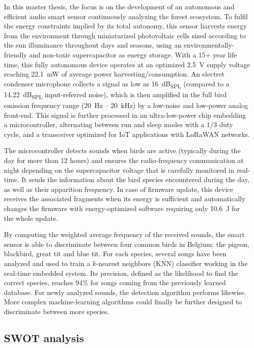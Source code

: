 \documentclass{EPL-master-thesis-covers-EN}
\begin{document}
In this master thesis, the focus is on the development of an autonomous and efficient audio smart sensor continuously analyzing the forest ecosystem. To fulfil the energy constraints implied by its total autonomy, this sensor harvests energy from the environment through miniaturized photovoltaic cells sized according to the sun illuminance throughout days and seasons, using an environmentally-friendly and non-toxic supercapacitor as energy storage.
With a 15+ year life time, this fully autonomous device operates at an optimized \SI{2.5}{V} supply voltage reaching \SI{22.1}{mW} of average power harvesting/consumption. An electret condenser microphone collects a signal as low as \SI{16}{dB_{SPL}} (compared to a \SI{14.22}{dB_{SPL}} input-referred noise), which is then amplified in the full bird emission frequency range (\SI{20}{Hz} -- \SI{20}{kHz}) by a low-noise and low-power analog front-end. This signal is further processed in an ultra-low-power chip embedding a microcontroller, alternating between run and sleep modes with a $1/3$ duty cycle, and a transceiver optimized for IoT applications with LoRaWAN networks. 

The microcontroller detects sounds when birds are active (typically during the day for more than 12 hours) and ensures the radio-frequency communication at night depending on the supercapacitor voltage that is carefully monitored in real-time. It sends the information about the bird species encountered during the day, as well as their apparition frequency. In case of firmware update, this device receives the associated fragments when its energy is sufficient and automatically changes the firmware with energy-optimized software requiring only \SI{10.6}{J} for the whole update.

By computing the weighted average frequency of the received sounds, the smart sensor is able to discriminate between four common birds in Belgium: the pigeon, blackbird, great tit and blue tit. For each species, several songs have been analyzed and used to train a $k$-nearest neighbors (KNN) classifier working in the real-time embedded system. Its precision, defined as the likelihood to find the correct species, reaches 94\% for songs coming from the previously learned database. For newly analyzed sounds, the detection algorithm performs likewise. More complex machine-learning algorithms could finally be further designed to discriminate between more species.


\subsection*{SWOT analysis}
\end{document}
